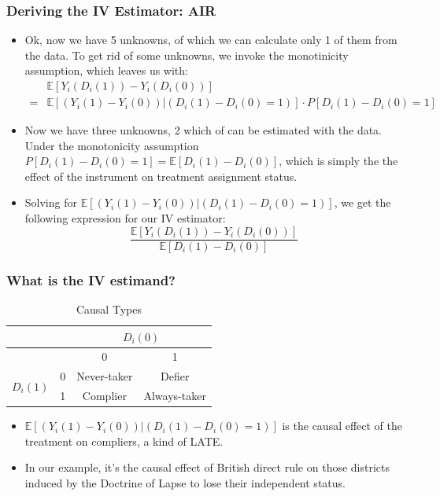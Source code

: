\documentclass{beamer}
\begin{document}
\begin{frame}
  \frametitle{Deriving the IV Estimator: AIR}
  \begin{itemize}
  \item Ok, now we have 5 unknowns, of which we can calculate only
    1 of them from the data. To get rid of some unknowns, we invoke the monotinicity
    assumption, which leaves us with:
  \begin{eqnarray*}
   &\mathbb{E}[Y_i(D_i(1))-Y_i(D_i(0))]  \\
 = & \mathbb{E}[(Y_i(1)-Y_i(0))|(D_i(1)-D_i(0)=1)] \cdot
 P[D_i(1)-D_i(0)=1]
  \end{eqnarray*}
\item Now we have three unknowns, 2 which of can be estimated with the
  data. Under the monotonicity assumption  $P[D_i(1)-D_i(0)=1] =
  \mathbb{E}[D_i(1)-D_i(0)] $, which is simply the the effect of the
  instrument on treatment assignment status.
\item Solving for $\mathbb{E}[(Y_i(1)-Y_i(0))|(D_i(1)-D_i(0)=1)]$, we
  get the following expression for our IV estimator: $$\frac{\mathbb{E}[Y_i(D_i(1))-Y_i(D_i(0))] }{\mathbb{E}[D_i(1)-D_i(0)] }$$
  \end{itemize}
\end{frame}



\begin{frame}
  \frametitle{What is the IV estimand?}
  \begin{table}[h]
    \centering
    \begin{tabular}{c c c c}
& & \multicolumn{2}{c}{$D_i(0)$} \\ \hline
& & 0 & 1 \\ \hline
\multirow{2}{*}{$D_i(1)$}&0 & Never-taker & Defier\\
&1 & Complier & Always-taker \\ \hline
      
    \end{tabular}
    \caption{Causal Types}
  \end{table}

  \begin{itemize}
  \item $\mathbb{E}[(Y_i(1)-Y_i(0))|(D_i(1)-D_i(0)=1)]$ is the causal
    effect of the treatment on compliers, a kind of LATE. 
  \item In our example, it's the causal effect of British direct rule
    on those districts induced by the Doctrine of Lapse to lose their
    independent status.  
  \end{itemize}
\end{frame}
\end{document}

